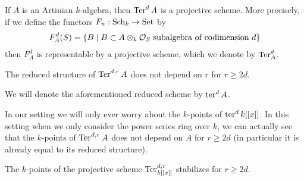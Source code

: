 \documentclass[12pt]{article}
\begin{document}
\begin{theorem}
    [Ishii] If $A$ is an Artinian $k$-algebra, then $\operatorname{Ter}^d A$ is a projective scheme. More precisely, 
    if we define the functors $F_n:\operatorname{Sch}_k\to \operatorname{Set}$ by \begin{align*}
        F^d_A(S) = \{B \mid B\subset A\otimes_k \mathcal{O}_S \text{ subalgebra of codimension }d\}
    \end{align*} then $F^d_A$ is representable by a projective scheme, which we denote by $\operatorname{Ter}^d_A$.
\end{theorem}


\begin{proposition}
    [Ishii] The reduced structure of $\operatorname{Ter}^{d,r} A$ does not depend on $r$ for $r\geq 2d$.
\end{proposition}

\begin{definition}
    We will denote the aforementioned reduced scheme by $\operatorname{ter}^d A$.
\end{definition}

In our setting we will only ever worry about the $k$-points of $\operatorname{ter}^d k[[x]]$. In this setting when 
we only consider the power series ring over $k$, we can actually see that the $k$-points of $\operatorname{Ter}^{d,r}A$
does not depend on $A$ for $r\geq 2d$ (in particular it is already equal to its reduced structure).




\begin{proposition}
    The $k$-points of the projective scheme $\operatorname{Ter}^{d,r}_{k[[x]]}$ stabilizes for $r\geq 2d$.
\end{proposition}
\end{document}

